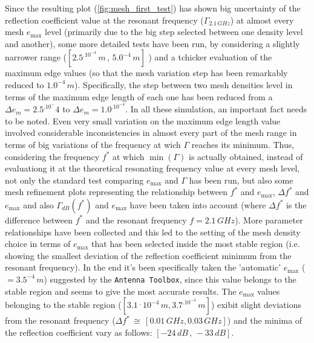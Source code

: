 \documentclass[12pt,a4paper]{article}
\begin{document}
{Since the resulting plot  (\cref{fig:mesh_first_test}) has shown big uncertainty of the reflection coefficient value at the resonant frequency ($\Gamma_{2.1\,GHz}$) at almost every mesh $e_{\max}$ level (primarily due to the big step selected between one density level and another), some more detailed tests have been run, by considering a slightly narrower range ($[2.5^.10^{-4}\,m\,,\,5.0^{-4}\,m]$ ) and a tchicker evaluation of the maximum edge values (so that the mesh variation step has been remarkably reduced to $1.0^{-4}\,m$). Specifically, the step between two mesh densities level in terms of the maximum edge length of each one has been reduced from a $\Delta e_m=2.5^.10^-4$ to $\Delta e_m=1.0^.10^{-4}$. In all these simulation, an important fact needs to be noted. Even very small variation on the maximum edge length value involved considerable inconsistencies in almost every part of the mesh range in terms of big variations of the frequency at wich $\Gamma$ reaches its minimum.  
Thus, considering the frequency $f^*$ at which $\min(\Gamma)$ is actually obtained, instead of evaluationg it at the theoretical resonating frequency value at every mesh level, not only the standard test comparing $e_{\max}$ and $\Gamma$ has been run, but also some mesh refinement plots representing the relationship between $f^*$ and $e_{\max}$, $\Delta f^*$ and $e_{\max}$ and also $\Gamma_{dB}(f^*)$ and $e_{\max}$ have been taken into account (where $\Delta f^*$ is the difference between $f^*$ and the resonant frequency $f=2.1\,GHz$). More parameter relationships have been collected and this led to the setting of the mesh density choice in terms of $e_{\max}$ that has been selected inside the most stable region (i.e. showing the smallest deviation of the reflection coefficient minimum from the resonant frequency). In the end it's been specifically taken the 'automatic' $e_{\max}$ ($=3.5^{-4}\,m$) suggested by the \texttt{\color{Mahogany}Antenna Toolbox}, since this value  belongs to the stable region and seems to give the most accurate results. The $e_{\max}$ values belonging to the stable region ($[3.1\,^.\,10^{-4}\,m,3.7^.10^{-4}\,m]$) exibit slight deviations from the resonant frequency ($\Delta f^*\,\cong\,[0.01\,GHz,0.03\,GHz]$) and the minima of the reflection coefficient vary as follows: $[-24\,dB\,,\,-33\,dB]$. 
\begin{figure}[h]
	\begin{center}
		

\end{center}
\end{figure}}
\end{document}
